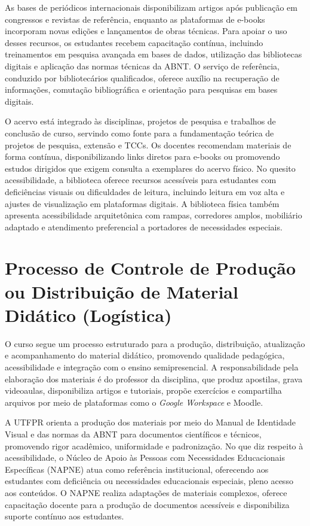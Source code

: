 As bases de periódicos internacionais disponibilizam artigos após publicação em congressos e revistas de referência, enquanto as plataformas de e-books incorporam novas edições e lançamentos de obras técnicas. Para apoiar o uso desses recursos, os estudantes recebem capacitação contínua, incluindo treinamentos em pesquisa avançada em bases de dados, utilização das bibliotecas digitais e aplicação das normas técnicas da ABNT. O serviço de referência, conduzido por bibliotecários qualificados, oferece auxílio na recuperação de informações, comutação bibliográfica e orientação para pesquisas em bases digitais.

O acervo está integrado às disciplinas, projetos de pesquisa e trabalhos de conclusão de curso, servindo como fonte para a fundamentação teórica de projetos de pesquisa, extensão e TCCs. Os docentes recomendam materiais de forma contínua, disponibilizando links diretos para e-books ou promovendo estudos dirigidos que exigem consulta a exemplares do acervo físico. No quesito acessibilidade, a biblioteca oferece recursos acessíveis para estudantes com deficiências visuais ou dificuldades de leitura, incluindo leitura em voz alta e ajustes de visualização em plataformas digitais. A biblioteca física também apresenta acessibilidade arquitetônica com rampas, corredores amplos, mobiliário adaptado e atendimento preferencial a portadores de necessidades especiais.

\section{Processo de Controle de Produção ou Distribuição de Material Didático (Logística)}

O curso segue um processo estruturado para a produção, distribuição, atualização e acompanhamento do material didático, promovendo qualidade pedagógica, acessibilidade e integração com o ensino semipresencial. A responsabilidade pela elaboração dos materiais é do professor da disciplina, que produz apostilas, grava videoaulas, disponibiliza artigos e tutoriais, propõe exercícios e compartilha arquivos por meio de plataformas como o \textit{Google Workspace} e Moodle.

A UTFPR orienta a produção dos materiais por meio do Manual de Identidade Visual \cite{utfpr2016manual} e das normas da ABNT para documentos científicos e técnicos, promovendo rigor acadêmico, uniformidade e padronização. No que diz respeito à acessibilidade, o Núcleo de Apoio às Pessoas com Necessidades Educacionais Específicas (NAPNE) atua como referência institucional, oferecendo aos estudantes com deficiência ou necessidades educacionais especiais, pleno acesso aos conteúdos. O NAPNE realiza adaptações de materiais complexos, oferece capacitação docente para a produção de documentos acessíveis e disponibiliza suporte contínuo aos estudantes.

